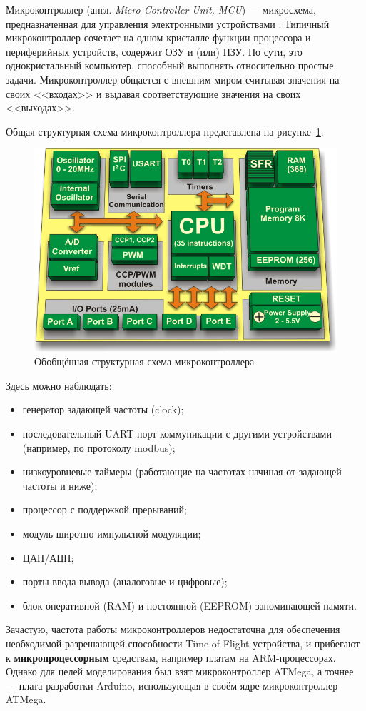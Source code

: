 Микроконтроллер (англ. \textit{Micro Controller Unit, MCU}) --- микросхема, предназначенная для управления электронными устройствами \cite{wiki:microcontroller}. Типичный микроконтроллер сочетает на одном кристалле функции процессора и периферийных устройств, содержит ОЗУ и (или) ПЗУ. По сути, это однокристальный компьютер, способный выполнять относительно простые задачи. Микроконтроллер общается с внешним миром считывая значения на своих <<входах>> и выдавая соответствующие значения на своих <<выходах>>.

Общая структурная схема микроконтроллера представлена на рисунке~\ref{fig:microstruct}.

\begin{figure}[ht]
    \includegraphics[width=.7\linewidth]{Figures/microstruct.png}
    \caption{Обобщённая структурная схема микроконтроллера}
    \label{fig:microstruct}
\end{figure}

Здесь можно наблюдать:

\begin{itemize}
    \item генератор задающей частоты (clock);
    \item последовательный UART-порт коммуникации с другими устройствами (например, по протоколу modbus);
    \item низкоуровневые таймеры (работающие на частотах начиная от задающей частоты и ниже);
    \item процессор с поддержкой прерываний;
    \item модуль широтно-импульсной модуляции;
    \item ЦАП/АЦП;
    \item порты ввода-вывода (аналоговые и цифровые);
    \item блок оперативной (RAM) и постоянной (EEPROM) запоминающей памяти.
\end{itemize}

Зачастую, частота работы микроконтроллеров недостаточна для обеспечения необходимой разрешающей способности Time of Flight устройства, и прибегают к \textbf{микропроцессорным} средствам, например платам на ARM-процессорах. Однако для целей моделирования был взят микроконтроллер ATMega, а точнее --- плата разработки Arduino, использующая в своём ядре микроконтроллер ATMega.
